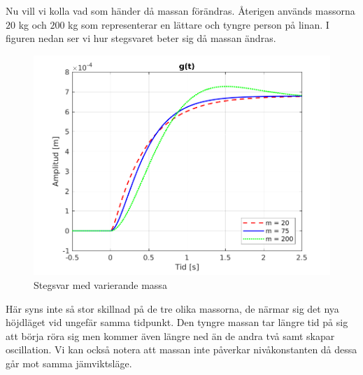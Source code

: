 \newpage
Nu vill vi kolla vad som händer då massan förändras. Återigen används massorna $20$ kg och $200$ kg som representerar en lättare och tyngre person på linan. I figuren nedan ser vi hur stegsvaret beter sig då massan ändras.
\begin{figure}[H]
    \centering
    \includegraphics[scale=0.9]{bilder/stegsvar_variation_m}
    \caption{Stegsvar med varierande massa}
    \label{fig:stegsvar_variation_m}
\end{figure}
Här syns inte så stor skillnad på de tre olika massorna, de närmar sig det nya höjdläget vid ungefär samma tidpunkt. Den tyngre massan tar längre tid på sig att börja röra sig men kommer även längre ned än de andra två samt skapar oscillation.
Vi kan också notera att massan inte påverkar nivåkonstanten då dessa går mot samma jämviktsläge.

